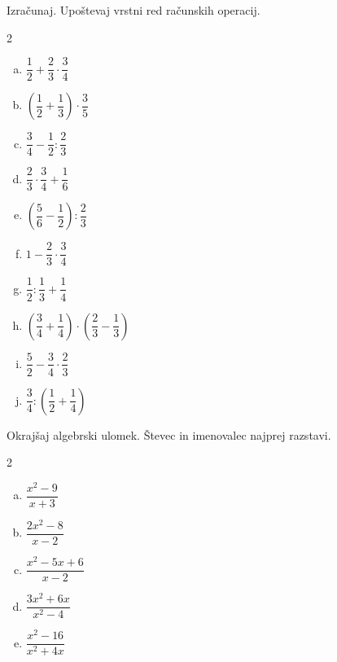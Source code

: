 \documentclass[a4paper,12pt]{letter}
\begin{document}
\begin{naloga}
Izra\v{c}unaj. Upo\v{s}tevaj vrstni red ra\v{c}unskih operacij.

\begin{multicols}{2}
\begin{enumerate}[a.)]
\item $\dfrac{1}{2}+\dfrac{2}{3}\cdot\dfrac{3}{4}$
\item $\left(\dfrac{1}{2}+\dfrac{1}{3}\right)\cdot\dfrac{3}{5}$
\item $\dfrac{3}{4}-\dfrac{1}{2}:\dfrac{2}{3}$
\item $\dfrac{2}{3}\cdot\dfrac{3}{4}+\dfrac{1}{6}$
\item $\left(\dfrac{5}{6}-\dfrac{1}{2}\right):\dfrac{2}{3}$
\item $1-\dfrac{2}{3}\cdot\dfrac{3}{4}$
\item $\dfrac{1}{2}:\dfrac{1}{3}+\dfrac{1}{4}$
\item $\left(\dfrac{3}{4}+\dfrac{1}{4}\right)\cdot\left(\dfrac{2}{3}-\dfrac{1}{3}\right)$
\item $\dfrac{5}{2}-\dfrac{3}{4}\cdot\dfrac{2}{3}$
\item $\dfrac{3}{4}:\left(\dfrac{1}{2}+\dfrac{1}{4}\right)$
\end{enumerate}
\end{multicols}
\end{naloga}
\newpage

\begin{naloga}
Okraj\v{s}aj algebrski ulomek. \v{S}tevec in imenovalec najprej razstavi.

\begin{multicols}{2}
\begin{enumerate}[a.)]
\item $\dfrac{x^2-9}{x+3}$
\item $\dfrac{2x^2-8}{x-2}$
\item $\dfrac{x^2-5x+6}{x-2}$
\item $\dfrac{3x^2+6x}{x^2-4}$
\item $\dfrac{x^2-16}{x^2+4x}$
\end{enumerate}
\end{multicols}
\end{naloga}
\end{document}
